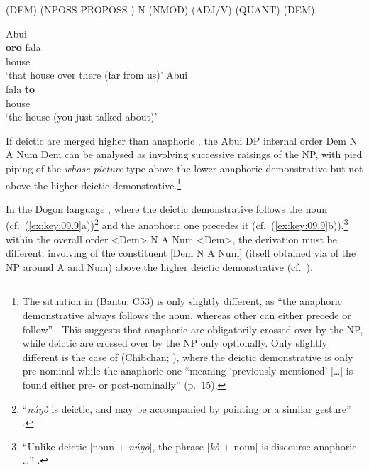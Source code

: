 \documentclass[output=paper]{langsci/langscibook}
\begin{document}
\ea\label{ex:key:09.7}
(DEM) (NPOSS PROPOSS-) N (NMOD) (ADJ/V) (QUANT) (DEM)
\z

\ea\label{ex:key:09.8}
	\ea Abui \parencite[111]{Kratochvil2007}\\
		\gll \textbf{oro} fala\\
			    \textbf{\Dem{}} house\\
		\glt ‘that house over there (far from us)’
	\ex Abui \parencite[114]{Kratochvil2007}\\
		\gll fala \textbf{to}\\
			    house \textbf{\Dem{}}\\
		\glt ‘the house (you just talked about)’
	\z
\z

If deictic  are merged higher than anaphoric
, the Abui DP internal order Dem N A Num
Dem can be analysed as involving successive raisings
of the NP, with pied piping of the \emph{whose picture}-type
above the lower anaphoric demonstrative but not above the higher
deictic demonstrative.\footnote{The situation in 
    (Bantu, C53) is only slightly different, as \enquote{the anaphoric
    demonstrative always follows the noun, whereas other 
can either precede or follow} \parencite[§2.4]{vandeVelde2005b}. This suggests
that anaphoric  are obligatorily crossed over by the NP,
while deictic  are crossed over by the NP only
optionally. Only slightly different is the case of  (Chibchan;
\citealt[§6.6]{CraigGrinevald1988}), where the deictic demonstrative
is only pre-nominal while the anaphoric one \enquote{meaning ‘previously
mentioned’ [\dots{}] is found either pre- or post-nominally} (p.\ 15).}

In the Dogon language , where the deictic demonstrative follows
the noun (cf.~(\ref{ex:key:09.9}a))\footnote{\enquote{\emph{núŋò} is deictic, and may be
accompanied by pointing or a similar gesture} \parencite[162]{Heath2008}.} and
the anaphoric one precedes it (cf.~(\ref{ex:key:09.9}b)),\footnote{\enquote{Unlike deictic
[noun + \emph{núŋò}], the phrase [\emph{kò} + noun] is discourse anaphoric
\dots{}} \parencite[164]{Heath2008}.} within the overall order
<Dem> N A Num <Dem>, the derivation must be
different, involving  of the constituent [Dem N A Num]
(itself obtained via  of the NP around A and Num) above the higher
deictic demonstrative (cf.\  \citealt{Cinque2005,Cinque2017}).
\end{document}
